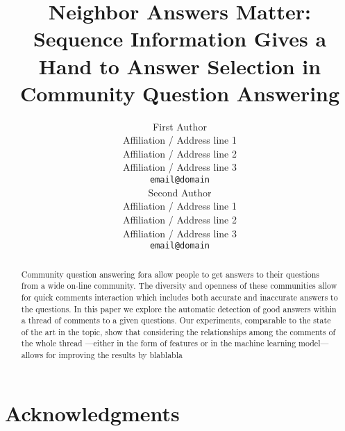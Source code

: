 \documentclass[11pt]{article}
\title{Neighbor Answers Matter: Sequence Information Gives a Hand to Answer Selection in Community Question Answering}
\author{First Author \\
  Affiliation / Address line 1 \\
  Affiliation / Address line 2 \\
  Affiliation / Address line 3 \\
  {\tt email@domain} \\\And
  Second Author \\
  Affiliation / Address line 1 \\
  Affiliation / Address line 2 \\
  Affiliation / Address line 3 \\
  {\tt email@domain} \\}
\date{}
\begin{document}
\maketitle
\begin{abstract}
Community question answering fora allow people to get answers to their questions from a wide on-line community. The diversity and openness of these communities allow for quick comments interaction which includes both accurate and inaccurate answers to the questions. In this paper we explore the automatic detection of good answers within a thread of comments to a given questions. Our experiments, comparable to the state of the art in the topic, show that considering the relationships among the comments of the whole thread ---either in the form of features or in the machine learning model--- allows for improving the results by blablabla
\end{abstract}








\section*{Acknowledgments}


%
%
\end{document}
